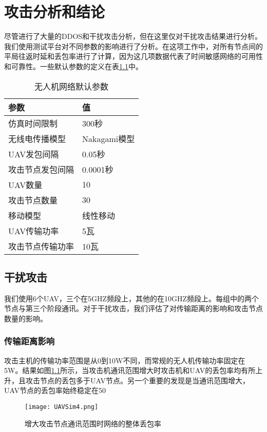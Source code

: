 \documentclass[bachelor,fontset=fandol,AutoFakeBold=true]{nuaathesis}
\begin{document}
\chapter{攻击分析和结论}
尽管进行了大量的DDOS和干扰攻击分析，但在这里仅对干扰攻击结果进行分析。我们使用测试平台对不同参数的影响进行了分析。在这项工作中，对所有节点间的平局往返时延和丢包率进行了计算，因为这几项数据代表了时间敏感网络的可用性和可靠性。一些默认参数的定义在表\ref{table1}中。
\begin{table}
    \centering
    \caption{无人机网络默认参数}\label{table1}
    \begin{tabular}{@{}ll@{}} \toprule
        参数 & 值 \\ \midrule
        仿真时间限制 & 300秒 \\
        无线电传播模型 & Nakagami模型\cite{22rhattoy2012impact} \\
        UAV发包间隔 & 0.05秒\cite{23zhan2011wireless} \\
        攻击节点发包间隔 & 0.0001秒  \\
        UAV数量 & 10  \\
        攻击节点数量 & 30  \\
        移动模型 & 线性移动  \\
        UAV传输功率 & 5瓦  \\
        攻击节点传输功率 & 10瓦  \\ \bottomrule
  \end{tabular}
\end{table}
    \section{干扰攻击}
    我们使用6个UAV，三个在5GHZ频段上，其他的在10GHZ频段上。每组中的两个节点与第三个阶段通讯。对于干扰攻击，我们评估了对传输距离的影响和攻击节点数量的影响。
        \subsection{传输距离影响}
        攻击主机的传输功率范围是从0到10W不同，而常规的无人机传输功率固定在5W。结果如图\ref{fig5}所示，当攻击机通讯范围增大时攻击机和UAV的丢包率均有所上升，且攻击节点的丢包多于UAV节点。另一个重要的发现是当通讯范围增大，UAV节点的丢包率始终稳定在50%
        \begin{figure}[]
	        \centering          	
            \texttt{[image: UAVSim4.png]}  
        \caption{增大攻击节点通讯范围时网络的整体丢包率} \label{fig5}
        \end{figure}
\end{document}
